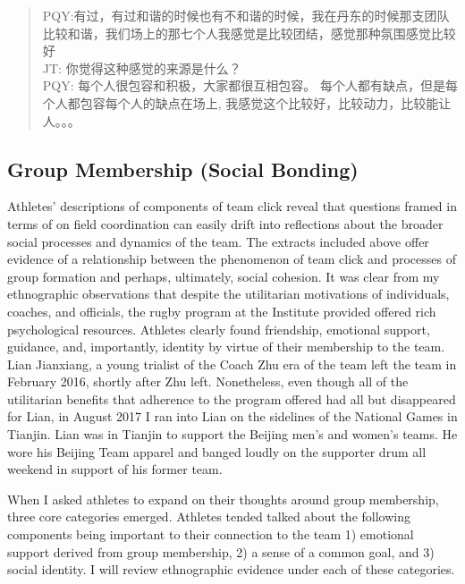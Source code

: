 \begin{CJK}{UTF8}{gbsn}
\begin{quotation}
  PQY:有过，有过和谐的时候也有不和谐的时候，我在丹东的时候那支团队比较和谐，我们场上的那七个人我感觉是比较团结，感觉那种氛围感觉比较好 \\
  JT: 你觉得这种感觉的来源是什么？\\
  PQY: 每个人很包容和积极，大家都很互相包容。 每个人都有缺点，但是每个人都包容每个人的缺点在场上, 我感觉这个比较好，比较动力，比较能让人。。。
\end{quotation}






\clearpage
\subsection{Group Membership (Social Bonding)}

Athletes' descriptions of components of team click reveal that questions framed in terms of on field coordination can easily drift into reflections about the broader social processes and dynamics of the team.  The extracts included above offer evidence of a relationship between the phenomenon of team click and processes of group formation and perhaps, ultimately, social cohesion. It was clear from my ethnographic observations that despite the utilitarian motivations of individuals, coaches, and officials, the rugby program at the Institute provided offered rich psychological resources.  Athletes clearly found friendship, emotional support, guidance, and, importantly, identity by virtue of their membership to the team.  Lian Jianxiang, a young trialist of the Coach Zhu era of the team left the team in February 2016, shortly after Zhu left.  Nonetheless, even though all of the utilitarian benefits that adherence to the program offered had all but disappeared for Lian, in August 2017 I ran into Lian on the sidelines of the National Games in Tianjin. Lian was in Tianjin to support the Beijing men's and women's teams.  He wore his Beijing Team apparel and banged loudly on the supporter drum all weekend in support of his former team.

When I asked athletes to expand on their thoughts around group membership, three core categories emerged.  Athletes tended talked about the following components being important to their connection to the team 1) emotional support derived from group membership, 2) a sense of a common goal, and 3) social identity. I will review ethnographic evidence under each of these categories.



\end{CJK}
